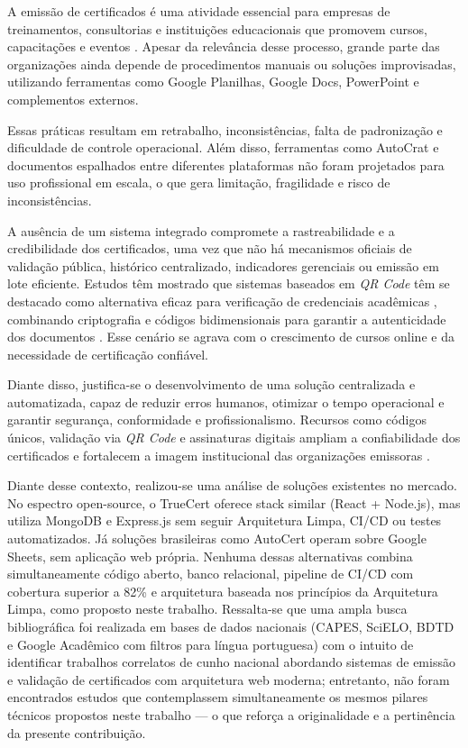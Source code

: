 
A emissão de certificados é uma atividade essencial para empresas de treinamentos, consultorias e instituições educacionais que promovem cursos, capacitações e eventos \cite{rahman2026,kulkarni2025}. Apesar da relevância desse processo, grande parte das organizações ainda depende de procedimentos manuais ou soluções improvisadas, utilizando ferramentas como Google Planilhas, Google Docs, PowerPoint e complementos externos.

Essas práticas resultam em retrabalho, inconsistências, falta de padronização e dificuldade de controle operacional. Além disso, ferramentas como AutoCrat \cite{autocrat2025} e documentos espalhados entre diferentes plataformas não foram projetados para uso profissional em escala, o que gera limitação, fragilidade e risco de inconsistências.

A ausência de um sistema integrado compromete a rastreabilidade e a credibilidade dos certificados, uma vez que não há mecanismos oficiais de validação pública, histórico centralizado, indicadores gerenciais ou emissão em lote eficiente. Estudos têm mostrado que sistemas baseados em \textit{QR Code} têm se destacado como alternativa eficaz para verificação de credenciais acadêmicas \cite{rahman2026}, combinando criptografia e códigos bidimensionais para garantir a autenticidade dos documentos \cite{wellem2021}. Esse cenário se agrava com o crescimento de cursos online e da necessidade de certificação confiável.

Diante disso, justifica-se o desenvolvimento de uma solução centralizada e automatizada, capaz de reduzir erros humanos, otimizar o tempo operacional e garantir segurança, conformidade e profissionalismo. Recursos como códigos únicos, validação via \textit{QR Code} e assinaturas digitais ampliam a confiabilidade dos certificados e fortalecem a imagem institucional das organizações emissoras \cite{kulkarni2025}.

Diante desse contexto, realizou-se uma análise de soluções existentes no mercado. No espectro open-source, o TrueCert \cite{truecert2025} oferece stack similar (React + Node.js), mas utiliza MongoDB e Express.js sem seguir Arquitetura Limpa, CI/CD ou testes automatizados. Já soluções brasileiras como AutoCert \cite{autocert2025} operam sobre Google Sheets, sem aplicação web própria. Nenhuma dessas alternativas combina simultaneamente código aberto, banco relacional, pipeline de CI/CD com cobertura superior a 82\% e arquitetura baseada nos princípios da Arquitetura Limpa, como proposto neste trabalho. Ressalta-se que uma ampla busca bibliográfica foi realizada em bases de dados nacionais (CAPES, SciELO, BDTD e Google Acadêmico com filtros para língua portuguesa) com o intuito de identificar trabalhos correlatos de cunho nacional abordando sistemas de emissão e validação de certificados com arquitetura web moderna; entretanto, não foram encontrados estudos que contemplassem simultaneamente os mesmos pilares técnicos propostos neste trabalho — o que reforça a originalidade e a pertinência da presente contribuição.

